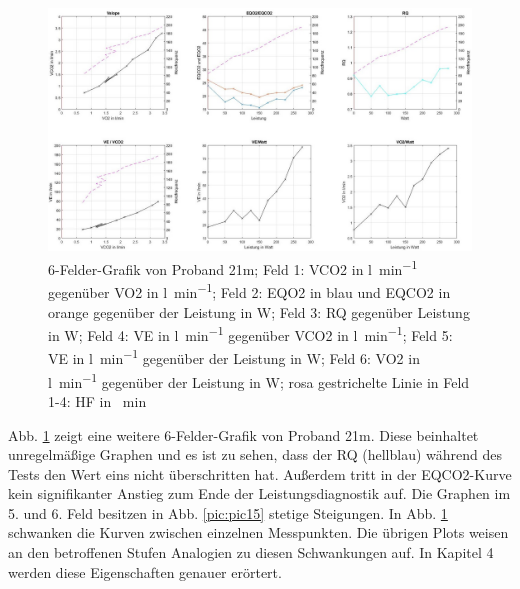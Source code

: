 %
\begin{figure}[H]
	\centering
	\includegraphics[width=\textwidth]{Bilder/plot_21m.jpg}
	\caption[6-Felder-Grafik von Proband 21m]{6-Felder-Grafik von Proband 21m; Feld 1: \acs{VCO2} in \si{\litre\per\minute} gegenüber \acs{VO2} in \si{\litre\per\minute}; Feld 2: \acs{EQO2} in blau und \acs{EQCO2} in orange gegenüber der Leistung in \si{\watt}; Feld 3: \acs{RQ} gegenüber Leistung in \si{\watt}; Feld 4: \acs{VE} in \si{\litre\per\minute} gegenüber \acs{VCO2} in \si{\litre\per\minute}; Feld 5: \acs{VE} in \si{\litre\per\minute} gegenüber der Leistung in \si{\watt}; Feld 6: \acs{VO2} in \si{\litre\per\minute} gegenüber der Leistung in \si{\watt}; rosa gestrichelte Linie in Feld 1-4: \acs{HF} in \si{\per\minute}}
	\label{pic:pic16}
\end{figure}
%
Abb. \ref{pic:pic16} zeigt eine weitere 6-Felder-Grafik von Proband 21m. Diese beinhaltet unregelmäßige Graphen und es ist zu sehen, dass der RQ (hellblau) während des Tests den Wert eins nicht überschritten hat. Außerdem tritt in der \acs{EQCO2}-Kurve kein signifikanter Anstieg zum Ende der Leistungsdiagnostik auf. Die Graphen im 5. und 6. Feld besitzen in Abb. \ref{pic:pic15} stetige Steigungen. In Abb. \ref{pic:pic16} schwanken die Kurven zwischen einzelnen Messpunkten. Die übrigen Plots weisen an den betroffenen Stufen Analogien zu diesen Schwankungen auf. In Kapitel 4 werden diese Eigenschaften genauer erörtert.
%

